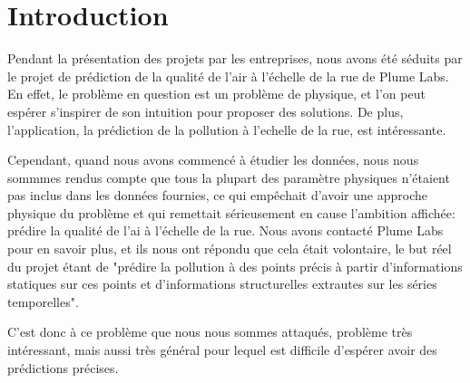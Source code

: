 \section*{Introduction}

Pendant la présentation des projets par les entreprises, nous avons été séduits par le projet de prédiction de la qualité de l'air à l'échelle de la rue de Plume Labs.
En effet, le problème en question est un problème de physique, et l'on peut espérer s'inspirer de son intuition pour proposer des solutions.
De plus, l'application, la prédiction de la pollution à l'echelle de la rue, est intéressante.

Cependant, quand nous avons commencé à étudier les données, nous nous sommmes rendus compte que tous la plupart des paramètre physiques n'étaient pas inclus dans les données fournies, ce qui empêchait d'avoir une approche physique du problème et qui remettait sérieusement en cause l'ambition affichée: prédire la qualité de l'ai à l'échelle de la rue.
Nous avons contacté Plume Labs pour en savoir plus, et ils nous ont répondu que cela était volontaire, le but réel du projet étant de "prédire la pollution à des points précis à partir d'informations statiques sur ces points et d'informations structurelles extrautes sur les séries temporelles".

C'est donc à ce problème que nous nous sommes attaqués, problème très intéressant, mais aussi très général pour lequel est difficile d'espérer avoir des prédictions précises.

